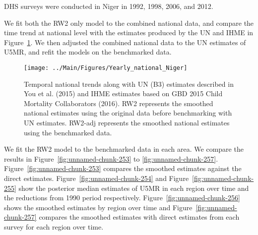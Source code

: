 \documentclass[12pt]{article}\usepackage[]{graphicx}\usepackage[]{color}
\newenvironment{knitrout}{}{} %
\begin{document}


DHS surveys were conducted in Niger in 1992, 1998, 2006, and 2012.

We fit both the RW2 only model to the combined national data, and compare the time trend at national level with the estimates produced by the UN and IHME in Figure~\ref{fig:unnamed-chunk-252}. We then adjusted the combined national data to the UN estimates of U5MR, and refit the models on the benchmarked data. 

\begin{knitrout}
\color{fgcolor}\begin{figure}[bht]

{\centering \texttt{[image: ../Main/Figures/Yearly\_national\_Niger]} 

}

\caption[Temporal national trends along with UN (B3) estimates described in You et al]{Temporal national trends along with UN (B3) estimates described in You et al. (2015) and IHME estimates based on GBD 2015 Child Mortality Collaborators (2016). RW2 represents the smoothed national estimates using the original data before benchmarking with UN estimates. RW2-adj represents the smoothed national estimates using the benchmarked data.}\label{fig:unnamed-chunk-252}
\end{figure}


\end{knitrout}
 

We fit the RW2 model to the benchmarked data in each area. 
We compare the results in Figure~\ref{fig:unnamed-chunk-253} to \ref{fig:unnamed-chunk-257}.
Figure~\ref{fig:unnamed-chunk-253} compares the smoothed estimates against the direct estimates. Figure~\ref{fig:unnamed-chunk-254} and Figure~\ref{fig:unnamed-chunk-255} show the posterior median estimates of U5MR in each region over time and the reductions from 1990 period respectively.
Figure~\ref{fig:unnamed-chunk-256} shows the smoothed estimates by region over time and Figure~\ref{fig:unnamed-chunk-257} compares the smoothed estimates with direct estimates from each survey for each region over time.


\end{document}
